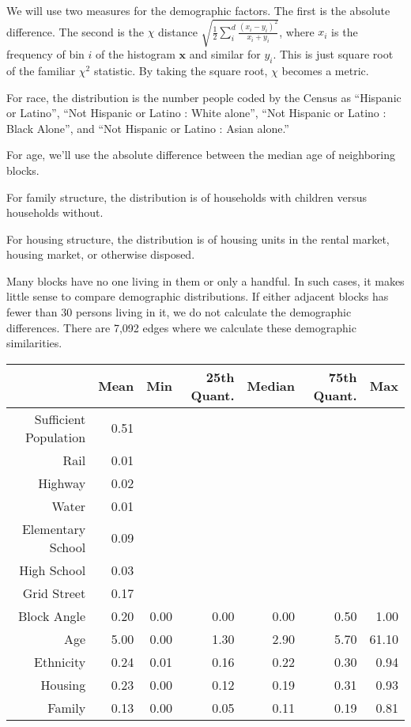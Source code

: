 \documentclass[12pt,letter]{article}\usepackage[]{graphicx}\usepackage[]{color}
\begin{document}
We will use two measures for the demographic factors. The first is the
absolute difference. The second is the $\chi$ distance $\sqrt{
\frac{1}{2} \sum_i^d \frac{(x_i - y_i)^2}{x_i + y_i}}$, where $x_i$ is
the frequency of bin $i$ of the histogram $\mathbf{x}$ and similar for
$y_i$. This is just square root of the familiar $\chi^2$ statistic. By
taking the square root, $\chi$ becomes a metric.\cite{pele_distance_2011}

For race, the distribution is the number people coded by the Census as
``Hispanic or Latino'', ``Not Hispanic or Latino : White alone'', ``Not Hispanic
or Latino : Black Alone'', and ``Not Hispanic or Latino : Asian alone.''

For age, we'll use the absolute difference between the median age of
neighboring blocks.

For family structure, the distribution is of households with children
versus households without. 

For housing structure, the distribution is of housing units in the
rental market, housing market, or otherwise disposed.

Many blocks have no one living in them or only a handful. In such
cases, it makes little sense to compare demographic distributions. If
either adjacent blocks has fewer than 30 persons living in it, we do
not calculate the demographic differences. There are
7,092 edges where we calculate these
demographic similarities.

\begin{table}[ht]
\centering
\begin{tabular}{rrrrrrr}
  \hline
 & Mean & Min & 25th Quant. & Median & 75th Quant. & Max \\ 
  \hline
Sufficient Population & 0.51 &  &  &  &  &  \\ 
  Rail & 0.01 &  &  &  &  &  \\ 
  Highway & 0.02 &  &  &  &  &  \\ 
  Water & 0.01 &  &  &  &  &  \\ 
  Elementary School & 0.09 &  &  &  &  &  \\ 
  High School & 0.03 &  &  &  &  &  \\ 
  Grid Street & 0.17 &  &  &  &  &  \\ 
  Block Angle & 0.20 & 0.00 & 0.00 & 0.00 & 0.50 & 1.00 \\ 
  Age & 5.00 & 0.00 & 1.30 & 2.90 & 5.70 & 61.10 \\ 
  Ethnicity & 0.24 & 0.01 & 0.16 & 0.22 & 0.30 & 0.94 \\ 
  Housing & 0.23 & 0.00 & 0.12 & 0.19 & 0.31 & 0.93 \\ 
  Family & 0.13 & 0.00 & 0.05 & 0.11 & 0.19 & 0.81 \\ 
   \hline
\end{tabular}
\end{table}
\end{document}
